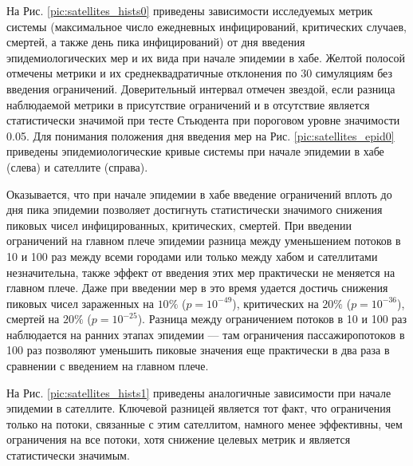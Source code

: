 \documentclass[a4paper,12pt]{article} %
\begin{document}
На Рис. \ref{pic:satellites_hists0} приведены зависимости исследуемых метрик системы (максимальное число ежедневных инфицирований, критических случаев, смертей, а также день пика инфицирований) от дня введения эпидемиологических мер и их вида при начале эпидемии в хабе. Желтой полосой отмечены метрики и их среднеквадратичные отклонения по 30 симуляциям без введения ограничений. Доверительный интервал отмечен звездой, если разница наблюдаемой метрики в присутствие ограничений и в отсутствие является статистически значимой при тесте Стьюдента при пороговом уровне значимости 0.05. Для понимания положения дня введения мер на Рис. \ref{pic:satellites_epid0} приведены эпидемиологические кривые системы при начале эпидемии в хабе (слева) и сателлите (справа).

Оказывается, что при начале эпидемии в хабе введение ограничений вплоть до дня пика эпидемии позволяет достигнуть статистически значимого снижения пиковых чисел инфицированных, критических, смертей. При введении ограничений на главном плече эпидемии разница между уменьшением потоков в 10 и 100 раз между всеми городами или только между хабом и сателлитами незначительна, также эффект от введения этих мер практически не меняется на главном плече. Даже при введении мер в это время удается достичь снижения пиковых чисел зараженных на $10\%$ ($p = 10^{-49}$), критических на $20\%$ ($p = 10^{-36}$), смертей на $20\%$ ($p = 10^{-25}$). Разница между ограничением потоков в 10 и 100 раз наблюдается на ранних этапах эпидемии --- там ограничения пассажиропотоков в 100 раз позволяют уменьшить пиковые значения еще практически в два раза в сравнении с введением на главном плече.

На Рис. \ref{pic:satellites_hists1} приведены аналогичные зависимости при начале эпидемии в сателлите. Ключевой разницей является тот факт, что ограничения только на потоки, связанные с этим сателлитом, намного менее эффективны, чем ограничения на все потоки, хотя снижение целевых метрик и является статистически значимым.
\end{document}
